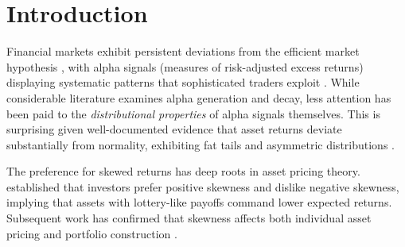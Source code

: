 \documentclass[11pt]{article}
\begin{document}
\begin{abstract}
when a thirteenth candidate is included
consisting of a seeded coin flip, which posts the highest realized mean of the
set. The weekly-return GPD shape parameter is imprecisely estimated ($\xi = -0.25$, 95\% CI $[-1.49, 0.27]$---an interval wide enough, and containing zero, that neither the sign nor a bounded-versus-heavy-tail reading is established), and tail clustering is weak ($\theta = 0.83$, 95\% CI $[0.60, 1.00]$). We conclude
that the evidence does not support broad alpha signal asymmetry in this setting
(with one distributional exception that does not yield a tradable edge) or its exploitability,
and we caution that unsigned-magnitude constructions can manufacture an
appearance of asymmetry that signed-data analysis does not support.

\vspace{0.5em}
\noindent\textbf{Keywords:} null result, alpha asymmetry, foreign exchange, skewness, market efficiency, extreme value theory

\vspace{0.3em}
\noindent\textbf{JEL Codes:} G11, G14, G15, C58
\end{abstract}



\section{Introduction}

Financial markets exhibit persistent deviations from the efficient market hypothesis \citep{fama1970efficient}, with alpha signals (measures of risk-adjusted excess returns) displaying systematic patterns that sophisticated traders exploit \citep{jegadeesh1993returns, moskowitz2012time}. While considerable literature examines alpha generation and decay, less attention has been paid to the \textit{distributional properties} of alpha signals themselves. This is surprising given well-documented evidence that asset returns deviate substantially from normality, exhibiting fat tails \citep{mandelbrot1963variation, cont2001empirical} and asymmetric distributions \citep{harvey2000conditional}.

The preference for skewed returns has deep roots in asset pricing theory. \citet{kraus1976skewness} established that investors prefer positive skewness and dislike negative skewness, implying that assets with lottery-like payoffs command lower expected returns. Subsequent work has confirmed that skewness affects both individual asset pricing \citep{harvey2000conditional, bali2011maxing} and portfolio construction \citep{mitton2007equilibrium, brunnermeier2007optimal}.
\end{document}
